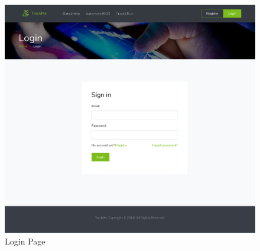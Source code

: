 \documentclass[a4paper, hidelinks, 12pt]{report}
\begin{document}
	\begin{figure}[H]
		\centering
		\includegraphics[scale=0.12]{UI/login.png}
		\caption[UI: Login Page]{Login Page}
		\label{fig:Login}
	\end{figure}
	
\end{document}
